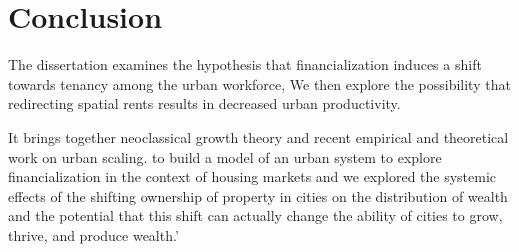 \chapter{Conclusion} \label{chapter-conclusions}

The dissertation examines the hypothesis that financialization induces a shift towards tenancy among the urban workforce, We then explore the possibility that redirecting spatial rents results in decreased urban productivity. 







It brings together \gls{neoclassical growth theory} and recent empirical and theoretical work on \gls{urban scaling}. 
to build a model of an urban system to explore financialization in the context of housing markets and we explored the systemic effects of the shifting ownership of property in cities on the distribution of wealth and the potential that this shift can actually change the ability of cities to grow, thrive, and produce wealth.'

